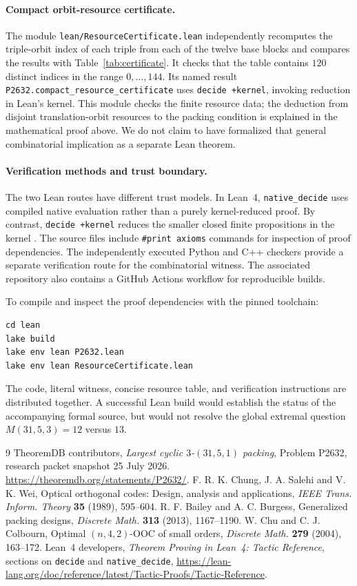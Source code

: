 \documentclass[11pt,a4paper]{article}
\begin{document}
\paragraph{Compact orbit-resource certificate.}
The module \texttt{lean/ResourceCertificate.lean} independently
recomputes the triple-orbit index of each triple from each of the twelve
base blocks and compares the results with Table~\ref{tab:certificate}.
It checks that the table contains $120$ distinct indices in the range
$0,\dots,144$. Its named result
\texttt{P2632.compact\_resource\_certificate} uses
\texttt{decide +kernel}, invoking reduction in Lean's kernel.
This module checks the finite resource data; the deduction from disjoint
translation-orbit resources to the packing condition is explained in the
mathematical proof above. We do not claim to have formalized that general
combinatorial implication as a separate Lean theorem.

\paragraph{Verification methods and trust boundary.}
The two Lean routes have different trust models. In Lean~4,
\texttt{native\_decide} uses compiled native evaluation rather than a
purely kernel-reduced proof. By contrast, \texttt{decide +kernel}
reduces the smaller closed finite propositions in the kernel
\cite{leandocs}. The source files include \texttt{\#print axioms}
commands for inspection of proof dependencies. The independently
executed Python and C++ checkers provide a separate verification
route for the combinatorial witness. The associated repository also
contains a GitHub Actions workflow for reproducible builds.

To compile and inspect the proof dependencies with the pinned toolchain:
\begin{verbatim}
cd lean
lake build
lake env lean P2632.lean
lake env lean ResourceCertificate.lean
\end{verbatim}
The code, literal witness, concise resource table, and verification
instructions are distributed together. A successful Lean build would
establish the status of the accompanying formal source, but would not
resolve the global extremal question $M(31,5,3)=12$ versus $13$.

\begin{thebibliography}{9}
 TheoremDB contributors,
\emph{Largest cyclic $3$-$(31,5,1)$ packing},
Problem P2632, research packet snapshot 25 July 2026.
\url{https://theoremdb.org/statements/P2632/}.
 F. R. K. Chung, J. A. Salehi and V. K. Wei,
Optical orthogonal codes: Design, analysis and applications,
\emph{IEEE Trans. Inform. Theory} \textbf{35} (1989), 595--604.
 R. F. Bailey and A. C. Burgess,
Generalized packing designs,
\emph{Discrete Math.} \textbf{313} (2013), 1167--1190.
 W. Chu and C. J. Colbourn,
Optimal $(n,4,2)$-OOC of small orders,
\emph{Discrete Math.} \textbf{279} (2004), 163--172.
 Lean~4 developers,
\emph{Theorem Proving in Lean~4: Tactic Reference},
sections on \texttt{decide} and \texttt{native\_decide},
\url{https://lean-lang.org/doc/reference/latest/Tactic-Proofs/Tactic-Reference}.
\end{thebibliography}
\end{document}
